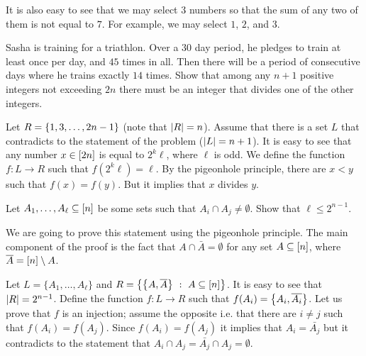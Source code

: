 \begin{chapterendexercises}
\begin{solution}
      It is also easy to see that we may select $3$ numbers so that the sum of
      any two of them is not equal to $7$. For example, we may select $1$, $2$,
      and $3$.
    \end{solution}
  \exercise Sasha is training for a triathlon. Over a $30$ day period, he
    pledges to train at least once per day, and $45$ times in all. Then there
    will be a period of consecutive days where he trains exactly $14$ times.
  \exercise Show that among any $n + 1$ positive integers not exceeding $2n$
    there must be an integer that divides one of the other integers.
    \begin{solution}
      Let $R = \set{1, 3, \dots, 2n - 1}$ (note that $\left|{R}\right| = n$).
      Assume that there is a set $L$ that contradicts to the statement of the
      problem ($\left|{L}\right| = n + 1$). It is easy to see that any number 
      $x \in {[{2n}]}$ is equal to $2^k \ell$, where $\ell$ is odd. We define
      the function $f : L \to R$ such that $f(2^k \ell) = \ell$. By the
      pigeonhole principle, there are $x < y$ such that $f(x) = f(y)$. But it
      implies that $x$ divides $y$.
    \end{solution}
  \exercise Let $A_1, \dots, A_\ell \subseteq {[{n}]}$ be some sets such that
    $A_i \cap A_j \neq \emptyset$. Show that $\ell \le 2^{n - 1}$.
    \begin{solution}
      We are going to prove this statement using the pigeonhole principle. The
      main component of the proof is the fact that $A \cap \bar{A} = \emptyset$
      for any set $A \subseteq {[{n}]}$, where $\overline{A} = {[{n}]} \setminus A$.

      Let $L = \{A_1, \dots, A_\ell\}$ and
      $R = \set[A \subseteq \range{n}]{\set{A, \bar{A}}}$. It is easy to see
      that $\left|{R}\right| = 2^{n - 1}$. Define the function $f : L \to R$ such that 
      $f(A_i) = \set{A_i, \bar{A_i}}$. Let us prove that $f$ is an injection; 
      assume the opposite i.e. that there are $i \neq j$ such that 
      $f(A_i) = f(A_j)$. Since $f(A_i) = f(A_j)$ it implies that $A_i =
      \bar{A_j}$ but it contradicts to the statement that $A_i \cap A_j =
      \bar{A_j} \cap A_j = \emptyset$.


\end{solution}
\end{chapterendexercises}
